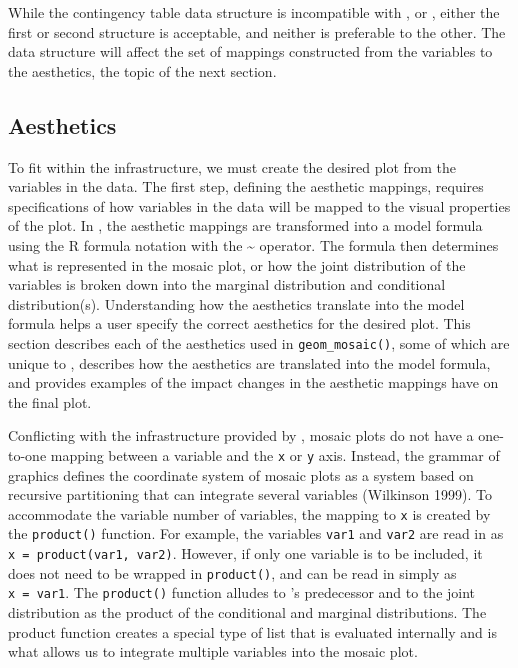 While the contingency table data structure is incompatible with , or , either the first or second structure is acceptable, and neither is preferable to the other. The data structure will affect the set of mappings constructed from the variables to the aesthetics, the topic of the next section.

\hypertarget{aesthetics}{%
\subsection{Aesthetics}\label{aesthetics}}

To fit  within the  infrastructure, we must create the desired plot from the variables in the data. The first step, defining the aesthetic mappings, requires specifications of how variables in the data will be mapped to the visual properties of the plot. In , the aesthetic mappings are transformed into a model formula using the R formula notation with the \textasciitilde{} operator. The formula then determines what is represented in the mosaic plot, or how the joint distribution of the variables is broken down into the marginal distribution and conditional distribution(s). Understanding how the aesthetics translate into the model formula helps a user specify the correct aesthetics for the desired plot. This section describes each of the aesthetics used in \texttt{geom\_mosaic()}, some of which are unique to , describes how the aesthetics are translated into the model formula, and provides examples of the impact changes in the aesthetic mappings have on the final plot.

Conflicting with the infrastructure provided by , mosaic plots do not have a one-to-one mapping between a variable and the \texttt{x} or \texttt{y} axis. Instead, the grammar of graphics defines the coordinate system of mosaic plots as a system based on recursive partitioning that can integrate several variables (Wilkinson 1999). To accommodate the variable number of variables, the mapping to \texttt{x} is created by the \texttt{product()} function. For example, the variables \texttt{var1} and \texttt{var2} are read in as \texttt{x\ =\ product(var1,\ var2)}. However, if only one variable is to be included, it does not need to be wrapped in \texttt{product()}, and can be read in simply as \texttt{x\ =\ var1}. The \texttt{product()} function alludes to 's predecessor  and to the joint distribution as the product of the conditional and marginal distributions. The product function creates a special type of list that is evaluated internally and is what allows us to integrate multiple variables into the mosaic plot.

